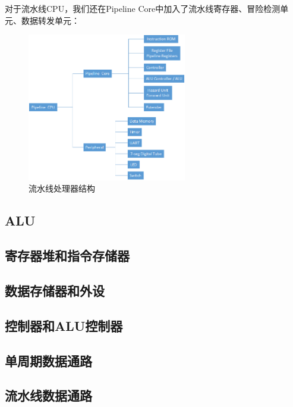\documentclass{article}
\begin{document}
            对于流水线CPU，我们还在Pipeline Core中加入了流水线寄存器、冒险检测单元、数据转发单元：
            \begin{figure}[H]
                    \centering
                    \includegraphics[width=0.62\textwidth]{images/pipeline.png}
                    \caption{\label{fig:pipeline}流水线处理器结构}
                \end{figure}
            
        \subsection{ALU}

        \subsection{寄存器堆和指令存储器}

        \subsection{数据存储器和外设}

        \subsection{控制器和ALU控制器}

        \subsection{单周期数据通路}

        \subsection{流水线数据通路}
\end{document}
